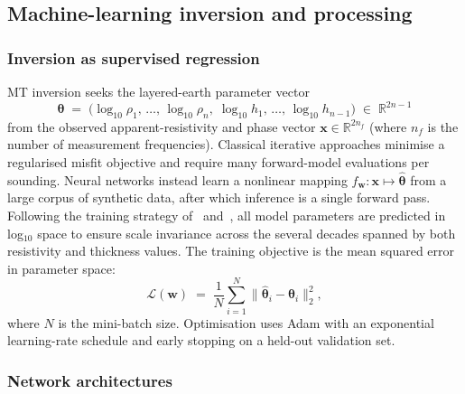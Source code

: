 \documentclass[review,12pt]{elsarticle}
\begin{document}
\subsection{Machine-learning inversion and processing}
\label{sec:mlmodels}

\subsubsection{Inversion as supervised regression}

MT inversion seeks the layered-earth parameter vector
\begin{equation}
  \boldsymbol\theta \;=\;
  \bigl(\log_{10}\rho_1,\,\ldots,\,\log_{10}\rho_n,\;
        \log_{10}h_1,\,\ldots,\,\log_{10}h_{n-1}\bigr)
  \;\in\;\mathbb{R}^{2n-1}
  \label{eq:theta}
\end{equation}
from the observed apparent-resistivity and phase vector
$\mathbf{x}\in\mathbb{R}^{2n_f}$ (where $n_f$ is the number of
measurement frequencies).
Classical iterative approaches minimise a regularised misfit objective
and require many forward-model evaluations per sounding.
Neural networks instead learn a nonlinear mapping
$f_{\bm{w}}:\mathbf{x}\mapsto\hat{\boldsymbol\theta}$ from a large corpus
of synthetic data, after which inference is a single forward pass.
Following the training strategy of~\citet{Liu2021} and~\citet{Guo2021},
all model parameters are predicted in log$_{10}$ space to ensure scale
invariance across the several decades spanned by both resistivity and
thickness values.
The training objective is the mean squared error in parameter space:
\begin{equation}
  \mathcal{L}(\bm{w}) \;=\;
  \frac{1}{N}\sum_{i=1}^{N}
  \bigl\|\hat{\boldsymbol\theta}_i - \boldsymbol\theta_i\bigr\|_2^2,
  \label{eq:loss}
\end{equation}
where $N$ is the mini-batch size.
Optimisation uses Adam with an exponential learning-rate schedule and
early stopping on a held-out validation set.

\subsubsection{Network architectures}
\end{document}
